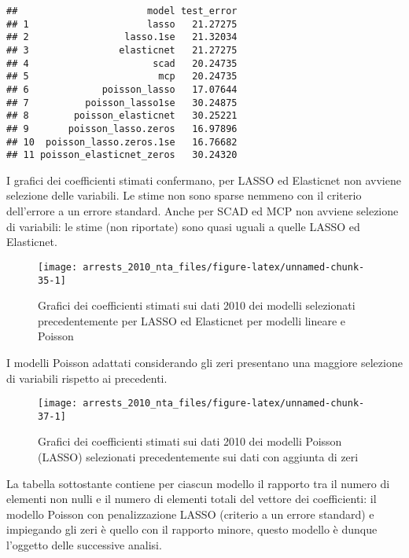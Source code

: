 \documentclass[
  ,
]{article}
\begin{document}
\begin{verbatim}
##                       model test_error
## 1                     lasso   21.27275
## 2                 lasso.1se   21.32034
## 3                elasticnet   21.27275
## 4                      scad   20.24735
## 5                       mcp   20.24735
## 6             poisson_lasso   17.07644
## 7          poisson_lasso1se   30.24875
## 8        poisson_elasticnet   30.25221
## 9       poisson_lasso.zeros   16.97896
## 10  poisson_lasso.zeros.1se   16.76682
## 11 poisson_elasticnet_zeros   30.24320
\end{verbatim}

I grafici dei coefficienti stimati confermano, per LASSO ed Elasticnet non avviene selezione delle variabili.
Le stime non sono sparse nemmeno con il criterio dell'errore a un errore standard.
Anche per SCAD ed MCP non avviene selezione di variabili: le stime (non riportate) sono quasi uguali a quelle LASSO ed Elasticnet.

\begin{figure}

{\centering \texttt{[image: arrests\_2010\_nta\_files/figure-latex/unnamed-chunk-35-1]} 

}

\caption{Grafici dei coefficienti stimati sui dati 2010 dei modelli selezionati precedentemente per LASSO ed Elasticnet per modelli lineare e Poisson}\label{fig:unnamed-chunk-35}
\end{figure}

I modelli Poisson adattati considerando gli zeri presentano una maggiore selezione di variabili rispetto ai precedenti.

\begin{figure}

{\centering \texttt{[image: arrests\_2010\_nta\_files/figure-latex/unnamed-chunk-37-1]} 

}

\caption{Grafici dei coefficienti stimati sui dati 2010 dei modelli Poisson (LASSO) selezionati precedentemente sui dati con aggiunta di zeri}\label{fig:unnamed-chunk-37}
\end{figure}

La tabella sottostante contiene per ciascun modello il rapporto tra il numero di elementi non nulli e il numero di elementi totali del vettore dei coefficienti: il modello Poisson con penalizzazione LASSO (criterio a un errore standard) e impiegando gli zeri è quello con il rapporto minore, questo modello è dunque l'oggetto delle successive analisi.
\end{document}
